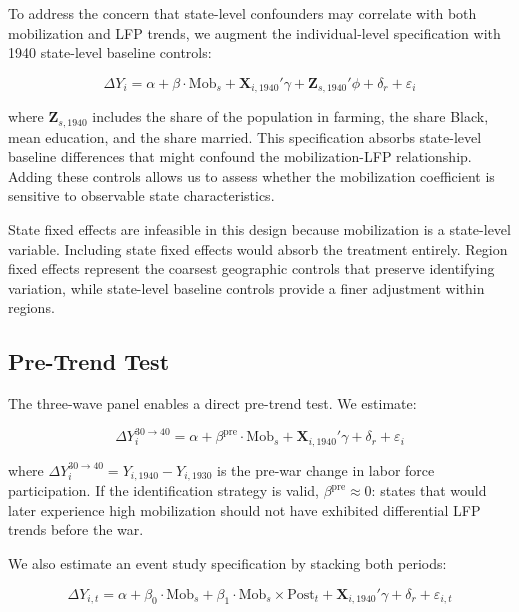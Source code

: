 \documentclass[12pt]{article}
\begin{document}
To address the concern that state-level confounders may correlate with both mobilization and LFP trends, we augment the individual-level specification with 1940 state-level baseline controls:

\begin{equation}
\Delta Y_i = \alpha + \beta \cdot \text{Mob}_s + \mathbf{X}_{i,1940}' \gamma + \mathbf{Z}_{s,1940}' \phi + \delta_r + \varepsilon_i
\label{eq:fd_state}
\end{equation}

\noindent where $\mathbf{Z}_{s,1940}$ includes the share of the population in farming, the share Black, mean education, and the share married. This specification absorbs state-level baseline differences that might confound the mobilization-LFP relationship. Adding these controls allows us to assess whether the mobilization coefficient is sensitive to observable state characteristics.

State fixed effects are infeasible in this design because mobilization is a state-level variable. Including state fixed effects would absorb the treatment entirely. Region fixed effects represent the coarsest geographic controls that preserve identifying variation, while state-level baseline controls provide a finer adjustment within regions.

\subsection{Pre-Trend Test}

The three-wave panel enables a direct pre-trend test. We estimate:

\begin{equation}
\Delta Y_i^{30 \to 40} = \alpha + \beta^{\text{pre}} \cdot \text{Mob}_s + \mathbf{X}_{i,1940}' \gamma + \delta_r + \varepsilon_i
\label{eq:pretrend}
\end{equation}

\noindent where $\Delta Y_i^{30 \to 40} = Y_{i,1940} - Y_{i,1930}$ is the pre-war change in labor force participation. If the identification strategy is valid, $\beta^{\text{pre}} \approx 0$: states that would later experience high mobilization should not have exhibited differential LFP trends before the war.

We also estimate an event study specification by stacking both periods:

\begin{equation}
\Delta Y_{i,t} = \alpha + \beta_0 \cdot \text{Mob}_s + \beta_1 \cdot \text{Mob}_s \times \text{Post}_t + \mathbf{X}_{i,1940}' \gamma + \delta_r + \varepsilon_{i,t}
\label{eq:eventstudy}
\end{equation}
\end{document}
